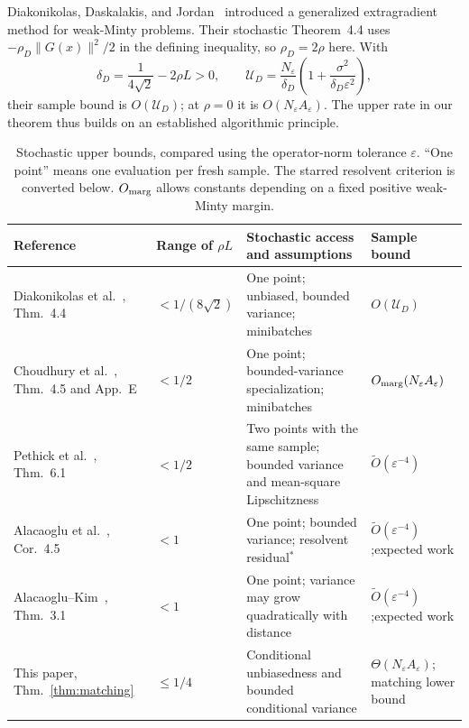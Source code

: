 \documentclass[11pt,a4paper]{article}
\newcommand{\eps}{\varepsilon}
\theoremstyle{definition}
\theoremstyle{remark}
\begin{document}
Diakonikolas, Daskalakis, and Jordan~\cite{ddj2021} introduced a generalized
extragradient method for weak-Minty problems. Their stochastic
Theorem~4.4 uses $-\rho_D\|G(x)\|^2/2$ in the defining inequality, so
$\rho_D=2\rho$ here. With
\begin{equation}\label{eq:ddj-conversion}
 \delta_D=\frac{1}{4\sqrt2}-2\rho L>0,
 \qquad
 \mathcal U_D=\frac{N_\eps}{\delta_D}
        \left(1+\frac{\sigma^2}{\delta_D\eps^2}\right),
\end{equation}
their sample bound is $O(\mathcal U_D)$; at $\rho=0$ it is
$O(N_\eps A_\eps)$. The upper rate in our theorem thus builds on an
established algorithmic principle.

\begin{table}[htbp]
\centering
\small
\setlength{\tabcolsep}{4pt}
\renewcommand{\arraystretch}{1.18}
\caption{Stochastic upper bounds, compared using the operator-norm tolerance
$\eps$. ``One point'' means one evaluation per fresh sample. The starred
resolvent criterion is converted below. $O_{\rm marg}$ allows constants
depending on a fixed positive weak-Minty margin.}
\label{tab:upper-comparison}
\begin{tabularx}{\textwidth}{@{}P{0.25\textwidth}P{0.15\textwidth}YP{0.20\textwidth}@{}}
\toprule
Reference & Range of $\rho L$ & Stochastic access and assumptions & Sample bound\\
\midrule
Diakonikolas et al.\ \cite{ddj2021}, Thm.~4.4
& $<1/(8\sqrt2)$
& One point; unbiased, bounded variance; minibatches
& $O(\mathcal U_D)$\\[4pt]
Choudhury et al.\ \cite{cgl2023}, Thm.~4.5 and App.~E
& $<1/2$
& One point; bounded-variance specialization; minibatches
& $O_{\rm marg}(N_\eps A_\eps)$\\[4pt]
Pethick et al.\ \cite{pethick2023}, Thm.~6.1
& $<1/2$
& Two points with the same sample; bounded variance and mean-square Lipschitzness
& $\widetilde O(\eps^{-4})$\\[4pt]
Alacaoglu et al.\ \cite{akw2024}, Cor.~4.5
& $<1$
& One point; bounded variance; resolvent residual$^{*}$
& $\widetilde O(\eps^{-4})$;\newline expected work\\[4pt]
Alacaoglu--Kim\ \cite{ak2026}, Thm.~3.1
& $<1$
& One point; variance may grow quadratically with distance
& $\widetilde O(\eps^{-4})$;\newline expected work\\[4pt]
This paper, Thm.~\ref{thm:matching}
& $\le1/4$
& Conditional unbiasedness and bounded conditional variance
& $\Theta(N_\eps A_\eps)$; matching lower bound\\
\bottomrule
\end{tabularx}
\end{table}
\end{document}
